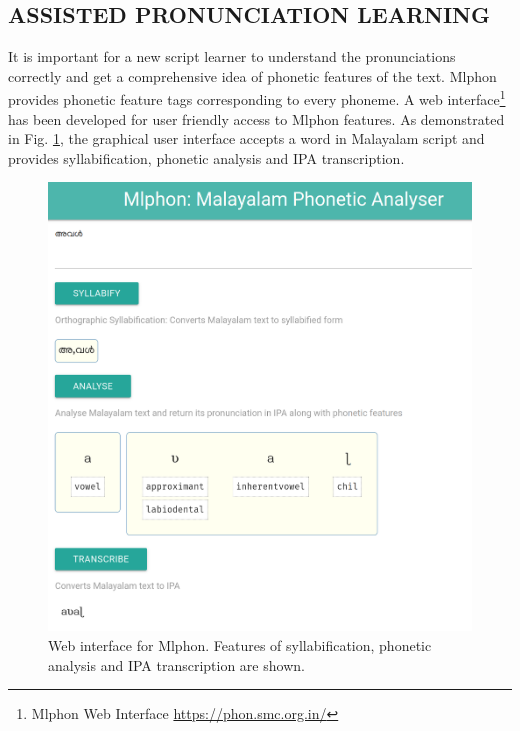 \documentclass{ieeeaccess}
\begin{document}
\subsection{ASSISTED PRONUNCIATION LEARNING}

It is important for a new script learner to understand the pronunciations correctly and get a comprehensive idea  of phonetic features of the text. Mlphon provides phonetic feature tags corresponding to every phoneme. A web interface\footnote {Mlphon Web Interface \url{https://phon.smc.org.in/}} has been developed for user friendly access to  Mlphon features. As demonstrated in Fig. \ref{mlphon-web}, the graphical user interface accepts a word in Malayalam script and  provides syllabification, phonetic analysis and IPA transcription. 

\begin{figure}[h]
	\centering
	\includegraphics[width=\linewidth]{mlphon-web.png}
	\caption{Web interface for Mlphon. Features of syllabification, phonetic analysis and IPA transcription are shown.}
	\label{mlphon-web}
\end{figure}
\end{document}
